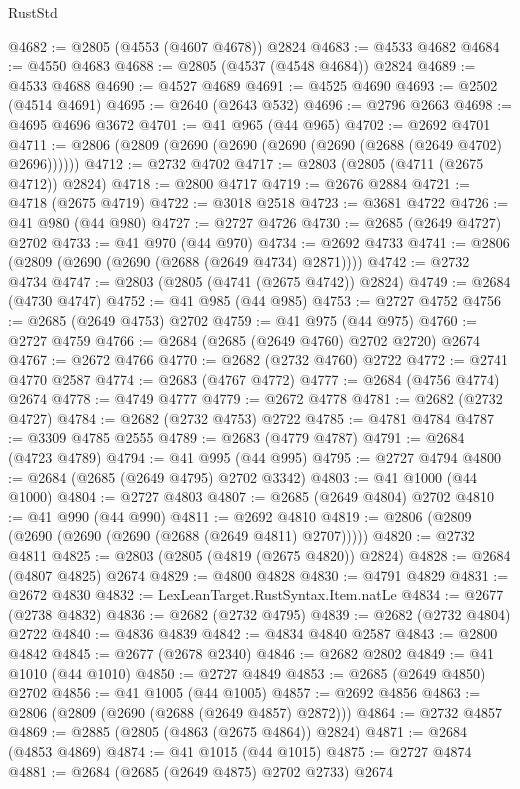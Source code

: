 \begin{lexlean}{RustStd}
\begin{coremodule}
{\begin{coremodule}
{{{{{{{{{{{{{{{{{{{{{{{{{{@4682 := @2805 (@4553 (@4607 @4678)) @2824
@4683 := @4533 @4682
@4684 := @4550 @4683
@4688 := @2805 (@4537 (@4548 @4684)) @2824
@4689 := @4533 @4688
@4690 := @4527 @4689
@4691 := @4525 @4690
@4693 := @2502 (@4514 @4691)
@4695 := @2640 (@2643 @532)
@4696 := @2796 @2663
@4698 := @4695 @4696 @3672
@4701 := @41 @965 (@44 @965)
@4702 := @2692 @4701
@4711 := @2806 (@2809 (@2690 (@2690 (@2690 (@2690 (@2688 (@2649 @4702) @2696))))))
@4712 := @2732 @4702
@4717 := @2803 (@2805 (@4711 (@2675 @4712)) @2824)
@4718 := @2800 @4717
@4719 := @2676 @2884
@4721 := @4718 (@2675 @4719)
@4722 := @3018 @2518
@4723 := @3681 @4722
@4726 := @41 @980 (@44 @980)
@4727 := @2727 @4726
@4730 := @2685 (@2649 @4727) @2702
@4733 := @41 @970 (@44 @970)
@4734 := @2692 @4733
@4741 := @2806 (@2809 (@2690 (@2690 (@2688 (@2649 @4734) @2871))))
@4742 := @2732 @4734
@4747 := @2803 (@2805 (@4741 (@2675 @4742)) @2824)
@4749 := @2684 (@4730 @4747)
@4752 := @41 @985 (@44 @985)
@4753 := @2727 @4752
@4756 := @2685 (@2649 @4753) @2702
@4759 := @41 @975 (@44 @975)
@4760 := @2727 @4759
@4766 := @2684 (@2685 (@2649 @4760) @2702 @2720) @2674
@4767 := @2672 @4766
@4770 := @2682 (@2732 @4760) @2722
@4772 := @2741 @4770 @2587
@4774 := @2683 (@4767 @4772)
@4777 := @2684 (@4756 @4774) @2674
@4778 := @4749 @4777
@4779 := @2672 @4778
@4781 := @2682 (@2732 @4727)
@4784 := @2682 (@2732 @4753) @2722
@4785 := @4781 @4784
@4787 := @3309 @4785 @2555
@4789 := @2683 (@4779 @4787)
@4791 := @2684 (@4723 @4789)
@4794 := @41 @995 (@44 @995)
@4795 := @2727 @4794
@4800 := @2684 (@2685 (@2649 @4795) @2702 @3342)
@4803 := @41 @1000 (@44 @1000)
@4804 := @2727 @4803
@4807 := @2685 (@2649 @4804) @2702
@4810 := @41 @990 (@44 @990)
@4811 := @2692 @4810
@4819 := @2806 (@2809 (@2690 (@2690 (@2690 (@2688 (@2649 @4811) @2707)))))
@4820 := @2732 @4811
@4825 := @2803 (@2805 (@4819 (@2675 @4820)) @2824)
@4828 := @2684 (@4807 @4825) @2674
@4829 := @4800 @4828
@4830 := @4791 @4829
@4831 := @2672 @4830
@4832 := LexLeanTarget.RustSyntax.Item.natLe
@4834 := @2677 (@2738 @4832)
@4836 := @2682 (@2732 @4795)
@4839 := @2682 (@2732 @4804) @2722
@4840 := @4836 @4839
@4842 := @4834 @4840 @2587
@4843 := @2800 @4842
@4845 := @2677 (@2678 @2340)
@4846 := @2682 @2802
@4849 := @41 @1010 (@44 @1010)
@4850 := @2727 @4849
@4853 := @2685 (@2649 @4850) @2702
@4856 := @41 @1005 (@44 @1005)
@4857 := @2692 @4856
@4863 := @2806 (@2809 (@2690 (@2688 (@2649 @4857) @2872)))
@4864 := @2732 @4857
@4869 := @2885 (@2805 (@4863 (@2675 @4864)) @2824)
@4871 := @2684 (@4853 @4869)
@4874 := @41 @1015 (@44 @1015)
@4875 := @2727 @4874
@4881 := @2684 (@2685 (@2649 @4875) @2702 @2733) @2674
}}}}}}}}}}}}}}}}}}}}}}}}}}
\end{coremodule}}
\end{coremodule}
\end{lexlean}

